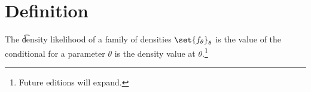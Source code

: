 

\section*{Definition}

The \t{density likelihood} of a family of densities $\set{f_{\theta }}_{\theta }$ is the value of the conditional for a parameter $\theta $ is the density value at $\theta $.\footnote{Future editions will expand.}

\blankpage